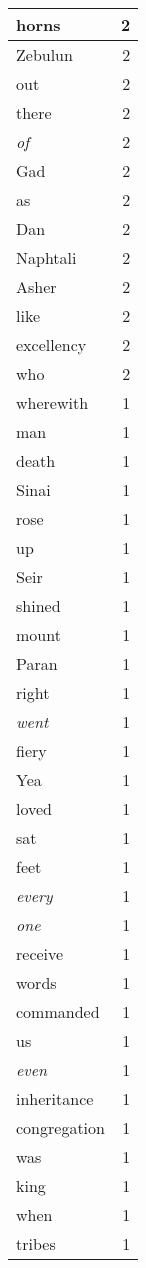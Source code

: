 \begin{center}
\begin{longtable}{l|r}
horns & 2 \\ \hline
Zebulun & 2 \\ \hline
out & 2 \\ \hline
there & 2 \\ \hline
\emph{of} & 2 \\ \hline
Gad & 2 \\ \hline
as & 2 \\ \hline
Dan & 2 \\ \hline
Naphtali & 2 \\ \hline
Asher & 2 \\ \hline
like & 2 \\ \hline
excellency & 2 \\ \hline
who & 2 \\ \hline
wherewith & 1 \\ \hline
man & 1 \\ \hline
death & 1 \\ \hline
Sinai & 1 \\ \hline
rose & 1 \\ \hline
up & 1 \\ \hline
Seir & 1 \\ \hline
shined & 1 \\ \hline
mount & 1 \\ \hline
Paran & 1 \\ \hline
right & 1 \\ \hline
\emph{went} & 1 \\ \hline
fiery & 1 \\ \hline
Yea & 1 \\ \hline
loved & 1 \\ \hline
sat & 1 \\ \hline
feet & 1 \\ \hline
\emph{every} & 1 \\ \hline
\emph{one} & 1 \\ \hline
receive & 1 \\ \hline
words & 1 \\ \hline
commanded & 1 \\ \hline
us & 1 \\ \hline
\emph{even} & 1 \\ \hline
inheritance & 1 \\ \hline
congregation & 1 \\ \hline
was & 1 \\ \hline
king & 1 \\ \hline
when & 1 \\ \hline
tribes & 1 \\ \hline

\end{longtable}
\end{center}
